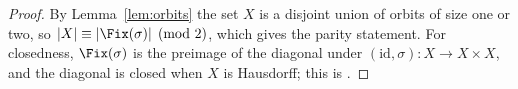 \begin{proof}
By Lemma~\ref{lem:orbits} the set $X$ is a disjoint union of orbits of size one or two, so $|X| \equiv |\Fix(\sigma)| \pmod 2$, which gives the parity statement. For closedness, $\Fix(\sigma)$ is the preimage of the diagonal under $(\mathrm{id},\sigma)\colon X\to X\times X$, and the diagonal is closed when $X$ is Hausdorff; this is \cite[Proposition 3.2]{Calloway14}.
\end{proof}